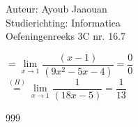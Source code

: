\documentclass[a4paper]{article}
\begin{document}
\noindent \large Auteur: Ayoub Jaaouan \\
\noindent \large Studierichting: Informatica\\
\noindent \large Oefeningenreeks 3C nr. 16.7\\

\medskip

\normalsize

$= \lim\limits_{x \rightarrow 1} \dfrac{(x-1)}{(9x^2-5x-4)} = \dfrac{0}{0}$\\

$\overset{(H)}{=}\lim\limits_{x \rightarrow 1} \dfrac{1}{(18x-5)} = \dfrac{1}{13}$\\





\begin{thebibliography}{999}
\end{thebibliography}
\end{document}
